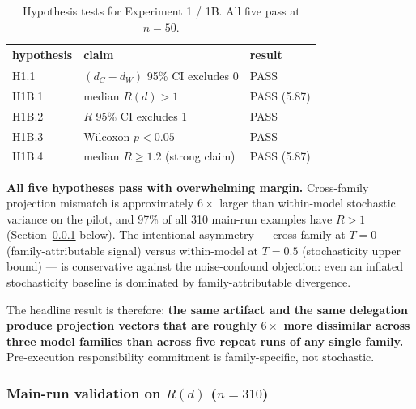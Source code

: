 \begin{table}[t]
\centering
\caption{Hypothesis tests for Experiment 1 / 1B. All five pass at $n = 50$.}
\label{tab:hypotheses}
\begin{tabular}{lll}
\toprule
\textbf{hypothesis} & \textbf{claim} & \textbf{result} \\
\midrule
H1.1   & $(d_C - d_W)$ 95\% CI excludes 0      & PASS \\
H1B.1  & median $R(d) > 1$                     & PASS (5.87) \\
H1B.2  & $R$ 95\% CI excludes 1                & PASS \\
H1B.3  & Wilcoxon $p < 0.05$                   & PASS \\
H1B.4  & median $R \geq 1.2$ (strong claim)    & PASS (5.87) \\
\bottomrule
\end{tabular}
\end{table}

\textbf{All five hypotheses pass with overwhelming margin.} Cross-family projection mismatch is approximately $6\times$ larger than within-model stochastic variance on the pilot, and 97\% of all 310 main-run examples have $R > 1$ (Section~\ref{sec:results:exp1b:mainrun} below). The intentional asymmetry --- cross-family at $T = 0$ (family-attributable signal) versus within-model at $T = 0.5$ (stochasticity upper bound) --- is conservative against the noise-confound objection: even an inflated stochasticity baseline is dominated by family-attributable divergence.

The headline result is therefore: \textbf{the same artifact and the same delegation produce projection vectors that are roughly $6\times$ more dissimilar across three model families than across five repeat runs of any single family.} Pre-execution responsibility commitment is family-specific, not stochastic.

\subsubsection{Main-run validation on $R(d)$ ($n = 310$)}
\label{sec:results:exp1b:mainrun}

